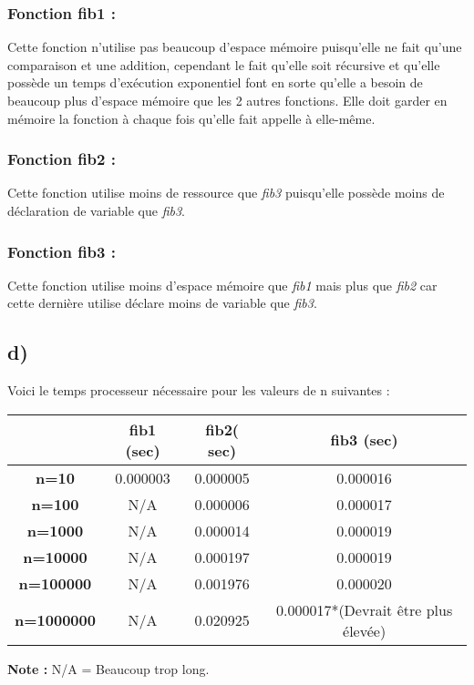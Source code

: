 \documentclass[12pt]{article}
\begin{document}
	  \subsubsection*{Fonction fib1 :}
      \noindent Cette fonction n'utilise pas beaucoup d'espace mémoire puisqu'elle ne fait qu'une comparaison et une addition, cependant le fait qu'elle soit récursive et qu'elle possède un temps d'exécution exponentiel font en sorte qu'elle a besoin de beaucoup plus d'espace mémoire que les 2 autres fonctions. Elle doit garder en mémoire la fonction à chaque fois qu'elle fait appelle à elle-même.
      \subsubsection*{Fonction fib2 :}
      \noindent Cette fonction utilise moins de ressource que \textit{fib3} puisqu'elle possède moins de déclaration de variable que \textit{fib3}.
      \subsubsection*{Fonction fib3 :}
      \noindent Cette fonction utilise moins d'espace mémoire que \textit{fib1} mais plus que \textit{fib2} car cette dernière utilise déclare moins de variable que \textit{fib3}.
    \subsection*{d)}
      \noindent Voici le temps processeur nécessaire pour les valeurs de n suivantes :
      \begin{table}[h]
      	\centering
        \begin{tabular}{|c|c|c|c|}
          \hline
          & \textbf{fib1 (sec)} & \textbf{fib2( sec)} & \textbf{fib3 (sec)} \\ \hline
          \textbf{n=10}      & 0.000003            & 0.000005            & 0.000016            \\ \hline
          \textbf{n=100}     & N/A                 & 0.000006            & 0.000017            \\ \hline
          \textbf{n=1000}    & N/A                 & 0.000014            & 0.000019            \\ \hline
          \textbf{n=10000}   & N/A                 & 0.000197            & 0.000019            \\ \hline
          \textbf{n=100000}  & N/A                 & 0.001976            & 0.000020            \\ \hline
          \textbf{n=1000000} & N/A                 & 0.020925            & 0.000017*(Devrait être plus élevée)            \\ \hline
        \end{tabular}
      \end{table}
      \newline
      \textbf{Note :} N/A = Beaucoup trop long.
\end{document}
